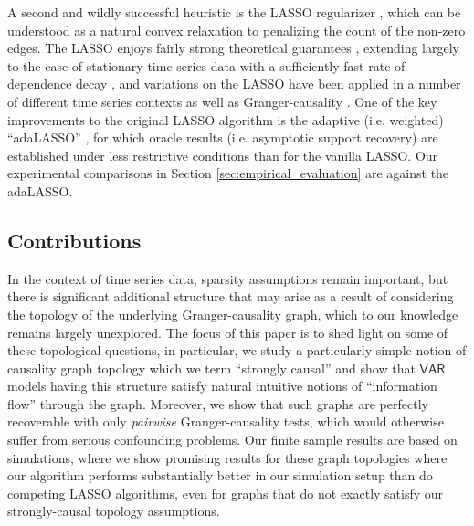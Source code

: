 \documentclass[12pt]{article}
\def\VAR{\mathsf{VAR}}  %
\begin{document}
A second and wildly successful heuristic is the LASSO regularizer
\cite{tibshirani1996regression}, which can be understood as a natural
convex relaxation to penalizing the count of the non-zero edges.  The
LASSO enjoys fairly strong theoretical guarantees
\cite{wainwright2009sharp}, extending largely to the case of
stationary time series data with a sufficiently fast rate of
dependence decay \cite{basu2015} \cite{wong2016lasso}
\cite{autoregressive_process_modelling_via_the_lasso_procedure}, and
variations on the LASSO have been applied in a number of different
time series contexts as well as Granger-causality
\cite{DBLP:journals/corr/HallacPBL17} \cite{haufe2008sparse}
\cite{bolstad2011causal} \cite{he2013stationary}
\cite{grouped_graphical_granger_modelling_for_gene_expression_regulatory_networks_discovery}.
One of the key improvements to the original LASSO algorithm is the
adaptive (i.e. weighted) ``adaLASSO'' \cite{adaptive_lasso_zou2006},
for which oracle results (i.e. asymptotic support recovery) are
established under less restrictive conditions than for the vanilla
LASSO.  Our experimental comparisons in Section
\ref{sec:empirical_evaluation} are against the
adaLASSO. %

\subsection{Contributions}
In the context of time series data, sparsity assumptions remain
important, but there is significant additional structure that may
arise as a result of considering the topology of the underlying
Granger-causality graph, which to our knowledge remains largely
unexplored.  The focus of this paper is to shed light on some of these
topological questions, in particular, we study a particularly simple
notion of causality graph topology which we term ``strongly causal''
and show that $\VAR$ models having this structure satisfy natural
intuitive notions of ``information flow'' through the graph.
Moreover, we show that such graphs are perfectly recoverable with only
\textit{pairwise} Granger-causality tests, which would otherwise suffer
from serious confounding problems.  Our finite sample results are
based on simulations, where we show promising results for these graph
topologies where our algorithm performs substantially better in our
simulation setup than do competing LASSO algorithms, even for graphs
that do not exactly satisfy our strongly-causal topology assumptions.
\end{document}
